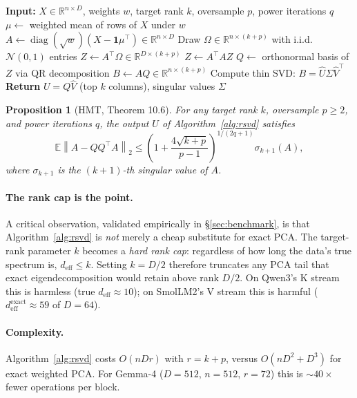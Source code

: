 \documentclass[11pt,a4paper]{article}
\theoremstyle{definition}
\theoremstyle{plain}
\newtheorem{proposition}[theorem]{Proposition}
\newcommand{\R}{\mathbb{R}}
\newcommand{\E}{\mathbb{E}}
\newcommand{\norm}[1]{\left\lVert#1\right\rVert}
\DeclareMathOperator{\diag}{diag}
\begin{document}
\begin{algorithm}[H]
\caption{Weighted randomized SVD (Algorithm~4.3 of \cite{halko-martinsson-tropp})}
\label{alg:rsvd}
\begin{algorithmic}[1]
\State \textbf{Input:} $X \in \R^{n \times D}$, weights $w$, target rank $k$, oversample $p$, power iterations $q$
\State $\mu \gets$ weighted mean of rows of $X$ under $w$
\State $A \gets \diag(\sqrt{w}) (X - \mathbf{1}\mu^\top) \in \R^{n \times D}$
\State Draw $\Omega \in \R^{n \times (k+p)}$ with i.i.d.\ $\mathcal{N}(0, 1)$ entries
\State $Z \gets A^\top \Omega \in \R^{D \times (k+p)}$
  \State $Z \gets A^\top A Z$ 
\EndFor
\State $Q \gets$ orthonormal basis of $Z$ via QR decomposition
\State $B \gets A Q \in \R^{n \times (k+p)}$
\State Compute thin SVD: $B = \hat U \Sigma \hat V^\top$
\State \textbf{Return} $U = Q \hat V$ (top $k$ columns), singular values $\Sigma$
\end{algorithmic}
\end{algorithm}

\begin{proposition}[HMT, Theorem 10.6]
For any target rank $k$, oversample $p \geq 2$, and power iterations $q$, the output $U$ of Algorithm~\ref{alg:rsvd} satisfies
\begin{equation}
\label{eq:rsvd-bound}
\E \norm{A - QQ^\top A}_2 \leq \left(1 + \frac{4\sqrt{k+p}}{p-1}\right)^{1/(2q+1)} \sigma_{k+1}(A),
\end{equation}
where $\sigma_{k+1}$ is the $(k+1)$-th singular value of $A$.
\end{proposition}

\paragraph{The rank cap is the point.}
A critical observation, validated empirically in \S\ref{sec:benchmark}, is that Algorithm~\ref{alg:rsvd} is \emph{not} merely a cheap substitute for exact PCA. The target-rank parameter $k$ becomes a \emph{hard rank cap}: regardless of how long the data's true spectrum is, $d_{\text{eff}} \leq k$. Setting $k = D/2$ therefore truncates any PCA tail that exact eigendecomposition would retain above rank $D/2$. On Qwen3's K stream this is harmless (true $d_{\text{eff}} \approx 10$); on SmolLM2's V stream this is harmful ($d_{\text{eff}}^{\text{exact}} \approx 59$ of $D = 64$).

\paragraph{Complexity.}
Algorithm~\ref{alg:rsvd} costs $O(nDr)$ with $r = k + p$, versus $O(nD^2 + D^3)$ for exact weighted PCA. For Gemma-4 ($D=512$, $n=512$, $r=72$) this is $\sim 40\times$ fewer operations per block.
\end{document}
